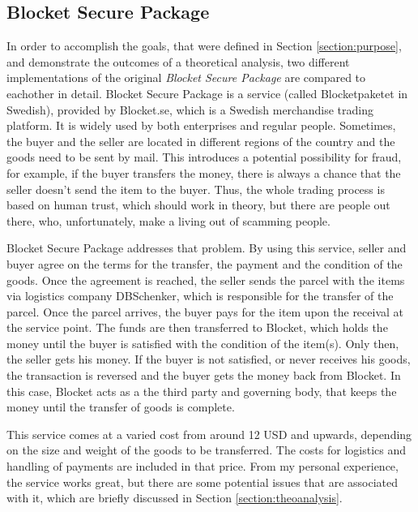 \subsection{Blocket Secure Package} \label{section:securepackage}

In order to accomplish the goals, that were defined in Section \ref{section:purpose}, and demonstrate the outcomes of a theoretical analysis, two different implementations of the original \emph{\Gls{Blocket Secure Package}} \citep{securepackage} are compared to eachother in detail. Blocket Secure Package is a service (called Blocketpaketet in Swedish), provided by Blocket.se, which is a Swedish merchandise trading platform. It is widely used by both enterprises and regular people. Sometimes, the buyer and the seller are located in different regions of the country and the goods need to be sent by mail. This introduces a potential possibility for fraud, for example, if the buyer transfers the money, there is always a chance that the seller doesn't send the item to the buyer. Thus, the whole trading process is based on human trust, which should work in theory, but there are people out there, who, unfortunately, make a living out of scamming people. 

Blocket Secure Package addresses that problem. By using this service, seller and buyer agree on the terms for the transfer, the payment and the condition of the goods. Once the agreement is reached, the seller sends the parcel with the items via logistics company DBSchenker, which is responsible for the transfer of the parcel. Once the parcel arrives, the buyer pays for the item upon the receival at the service point. The funds are then transferred to Blocket, which holds the money until the buyer is satisfied with the condition of the item(s). Only then, the seller gets his money. If the buyer is not satisfied, or never receives his goods, the transaction is reversed and the buyer gets the money back from Blocket. In this case, Blocket acts as a the third party and governing body, that keeps the money until the transfer of goods is complete.

This service comes at a varied cost from around 12 USD and upwards, depending on the size and weight of the goods to be transferred. The costs for logistics and handling of payments are included in that price. From my personal experience, the service works great, but there are some potential issues that are associated with it, which are briefly discussed in Section \ref{section:theoanalysis}.




